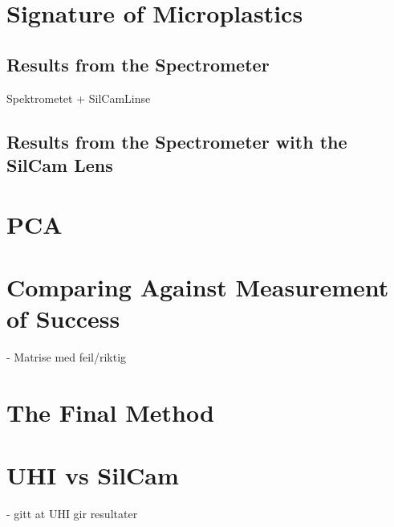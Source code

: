 \section{Signature of Microplastics}
\subsection{Results from the Spectrometer} Spektrometet + SilCamLinse
\subsection{Results from the Spectrometer with the SilCam Lens}
\section{PCA}
\section{Comparing Against Measurement of Success} - Matrise med feil/riktig
\section{The Final Method} 
\section{UHI vs SilCam} - gitt at UHI gir resultater